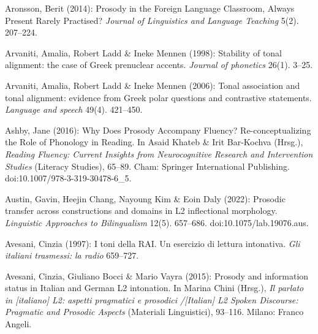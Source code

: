 \begin{styleBibliography}
Aronsson, Berit (2014): Prosody in the Foreign Language Classroom, Always Present Rarely Practised? \textit{Journal of Linguistics and Language Teaching} 5(2). 207–224.
\end{styleBibliography}

\begin{styleBibliography}
Arvaniti, Amalia, Robert Ladd \& Ineke Mennen (1998): Stability of tonal alignment: the case of Greek prenuclear accents. \textit{Journal of phonetics} 26(1). 3–25.
\end{styleBibliography}

\begin{styleBibliography}
Arvaniti, Amalia, Robert Ladd \& Ineke Mennen (2006): Tonal association and tonal alignment: evidence from Greek polar questions and contrastive statements. \textit{Language and speech} 49(4). 421–450.
\end{styleBibliography}

\begin{styleBibliography}
Ashby, Jane (2016): Why Does Prosody Accompany Fluency? Re-conceptualizing the Role of Phonology in Reading. In Asaid Khateb \& Irit Bar-Kochva (Hrsg.), \textit{Reading Fluency: Current Insights from Neurocognitive Research and Intervention Studies} (Literacy Studies), 65–89. Cham: Springer International Publishing. doi:10.1007/978-3-319-30478-6\_5.
\end{styleBibliography}

\begin{styleBibliography}
Austin, Gavin, Heejin Chang, Nayoung Kim \& Eoin Daly (2022): Prosodic transfer across constructions and domains in L2 inflectional morphology. \textit{Linguistic Approaches to Bilingualism} 12(5). 657–686. doi:10.1075/lab.19076.aus.
\end{styleBibliography}

\begin{styleBibliography}
Avesani, Cinzia (1997): I toni della RAI. Un esercizio di lettura intonativa. \textit{Gli italiani trasmessi: la radio} 659–727.
\end{styleBibliography}

\begin{styleBibliography}
Avesani, Cinzia, Giuliano Bocci \& Mario Vayra (2015): Prosody and information status in Italian and German L2 intonation. In Marina Chini (Hrsg.), \textit{Il parlato in [italiano] L2: aspetti pragmatici e prosodici /[Italian] L2 Spoken Discourse: Pragmatic and Prosodic Aspects} (Materiali Linguistici), 93–116. Milano: Franco Angeli.
\end{styleBibliography}

